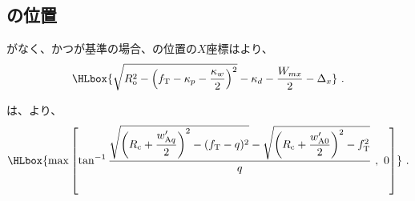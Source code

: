 \subsection{\KeywayCenter の位置}
\Outcut がなく、かつ\AsideKeywayDepth が基準の場合、\KeywayCenter の位置の$X$座標はより、
\begin{align*}
  \HLbox{%
    \sqrt{R_\mathrm o^2-\left(f_\mathrm T-\kappa_p-\frac{\kappa_w}2\right)^2}
    -\kappa_d
    -\frac{W_{mx}}2
    -\Delta_x%
  }\ .
\end{align*}



\DimpleAngle は、より、
\begin{align*}
  \HLbox{%
  \max\left[
  \tan^{-1}\frac{\displaystyle
           \sqrt{\left(R_\mathrm c+\frac{w'_{\mathrm Aq}}2\right)^2-(f_\mathrm T-q)^2}
           -\sqrt{\left(R_\mathrm c+\frac{w'_{\mathrm A0}}2\right)^2-f_\mathrm T^2}}q~,~0
  \right]%
  }\ .
\end{align*}

